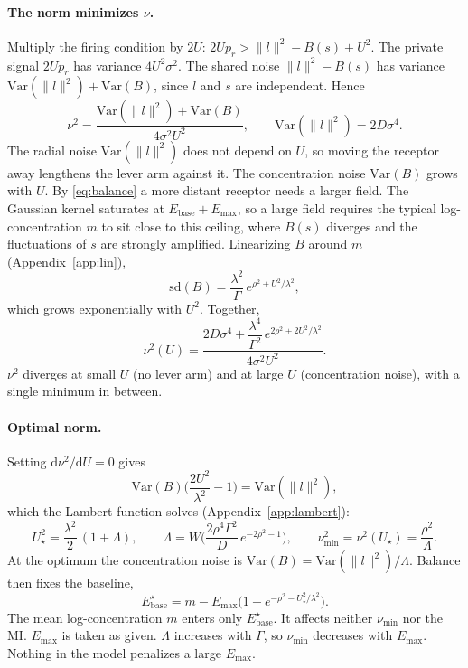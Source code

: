 \documentclass[11pt,a4paper]{article}
\newcommand{\Var}{\mathrm{Var}}
\newcommand{\sd}{\mathrm{sd}}
\newcommand{\Ebase}{E_{\mathrm{base}}}
\newcommand{\Emax}{E_{\mathrm{max}}}
\begin{document}
\paragraph{The norm minimizes $\nu$.} Multiply the firing condition by $2U$:
$2U p_r>\|l\|^2-B(s)+U^2$. The private signal $2Up_r$ has variance $4U^2\sigma^2$. The
shared noise $\|l\|^2-B(s)$ has variance $\Var(\|l\|^2)+\Var(B)$, since $l$ and $s$ are
independent. Hence
\begin{equation}
  \nu^2=\frac{\Var(\|l\|^2)+\Var(B)}{4\sigma^2U^2},
  \qquad
  \Var(\|l\|^2)=2D\sigma^4 .
  \label{eq:nu2}
\end{equation}
The radial noise $\Var(\|l\|^2)$ does not depend on $U$, so moving the receptor away
lengthens the lever arm against it. The concentration noise $\Var(B)$ grows with $U$. By
\eqref{eq:balance} a more distant receptor needs a larger field. The Gaussian kernel
saturates at $\Ebase+\Emax$, so a large field requires the typical log-concentration $m$ to
sit close to this ceiling, where $B(s)$ diverges and the fluctuations of $s$ are strongly
amplified. Linearizing $B$ around $m$ (Appendix~\ref{app:lin}),
\begin{equation}
  \sd(B)=\frac{\lambda^2}{\Gamma}\,e^{\rho^2+U^2/\lambda^2},
  \label{eq:sdB}
\end{equation}
which grows exponentially with $U^2$. Together,
\begin{equation}
  \boxed{\;\nu^2(U)=\frac{2D\sigma^4+\dfrac{\lambda^4}{\Gamma^2}\,e^{2\rho^2+2U^2/\lambda^2}}
  {4\sigma^2U^2}.\;}
  \label{eq:nuU}
\end{equation}
$\nu^2$ diverges at small $U$ (no lever arm) and at large $U$ (concentration noise), with a
single minimum in between.

\paragraph{Optimal norm.} Setting $\mathrm d\nu^2/\mathrm dU=0$ gives
\begin{equation}
  \Var(B)\Big(\frac{2U^2}{\lambda^2}-1\Big)=\Var(\|l\|^2),
  \label{eq:stationary}
\end{equation}
which the Lambert function solves (Appendix~\ref{app:lambert}):
\begin{equation}
  \boxed{\;U_\star^2=\frac{\lambda^2}{2}\,(1+\Lambda),
  \qquad
  \Lambda=W\Big(\frac{2\rho^4\Gamma^2}{D}\,e^{-2\rho^2-1}\Big),
  \qquad
  \nu_{\min}^2=\nu^2(U_\star)=\frac{\rho^2}{\Lambda}.\;}
  \label{eq:Ustar}
\end{equation}
At the optimum the concentration noise is $\Var(B)=\Var(\|l\|^2)/\Lambda$. Balance then
fixes the baseline,
\begin{equation}
  \Ebase^\star=m-\Emax\Big(1-e^{-\rho^2-U_\star^2/\lambda^2}\Big).
  \label{eq:Ebase}
\end{equation}
The mean log-concentration $m$ enters only $\Ebase^\star$. It affects neither $\nu_{\min}$
nor the MI.
$\Emax$ is taken as given. $\Lambda$ increases with $\Gamma$, so $\nu_{\min}$ decreases with
$\Emax$. Nothing in the model penalizes a large $\Emax$.
\end{document}
